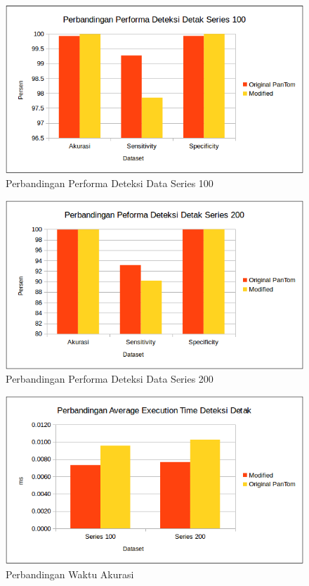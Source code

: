 \begin{figure}[H]
	\centering
	\includegraphics[scale=0.65]{images/beat_perform_100.png}
	\caption{Perbandingan Performa Deteksi Data Series 100}
	\label{fig:compare_performance_100}
\end{figure}
\begin{figure}[H]
	\centering
	\includegraphics[scale=0.65]{images/beat_perform_200.png}
	\caption{Perbandingan Performa Deteksi Data Series 200}
	\label{fig:compare_performance_200}
\end{figure}
\begin{figure}[H]
	\centering
	\includegraphics[scale=0.65]{images/beat_exec.png}
	\caption{Perbandingan Waktu Akurasi}
	\label{fig:compare_exec}
\end{figure}

